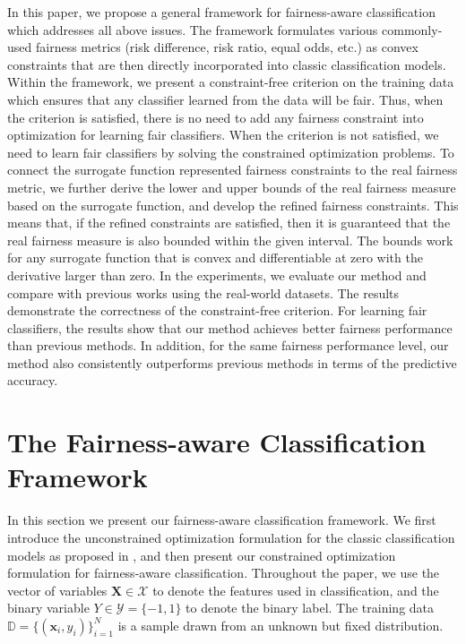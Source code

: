 \documentclass[letterpaper]{article} %
\newcommand{\X}{\mathbf{X}}
\newcommand{\x}{\mathbf{x}}
\newcommand{\Y}{Y}
\newcommand{\y}{y}
\begin{document}
In this paper, we propose a general framework for fairness-aware classification which addresses all above issues. The framework formulates various commonly-used fairness metrics (risk difference, risk ratio, equal odds, etc.) as convex constraints that are then directly incorporated into classic classification models. Within the framework, we present a constraint-free criterion on the training data which ensures that any classifier learned from the data will be fair. Thus, when the criterion is satisfied, there is no need to add any fairness constraint into optimization for learning fair classifiers. When the criterion is not satisfied, we need to learn fair classifiers by solving the constrained optimization problems. To connect the surrogate function represented fairness constraints to the real fairness metric, we further derive the lower and upper bounds of the real fairness measure based on the surrogate function, and develop the refined fairness constraints. This means that, if the refined constraints are satisfied, then it is guaranteed that the real fairness measure is also bounded within the given interval. The bounds work for any surrogate function that is convex and differentiable at zero with the derivative larger than zero.
In the experiments, we evaluate our method and compare with previous works using the real-world datasets. The results demonstrate the correctness of the constraint-free criterion. For learning fair classifiers, the results show that our method achieves better fairness performance than previous methods. In addition, for the same fairness performance level, our method also consistently outperforms previous methods in terms of the predictive accuracy.


\section{The Fairness-aware Classification Framework}\label{sec:fcf}
In this section we present our fairness-aware classification framework. We first introduce the unconstrained optimization formulation for the classic classification models as proposed in \cite{Bartlett2006}, and then present our constrained optimization formulation for fairness-aware classification. Throughout the paper, we use the vector of variables $\X \in \mathcal{X}$ to denote the features used in classification, and the binary variable $\Y \in \mathcal{Y} = \{-1,1\}$ to denote the binary label. The training data $\mathbb{D} = \{ (\x_i, \y_i)\}_{i=1}^{N}$ is a sample drawn from an unknown but fixed distribution.
\end{document}
